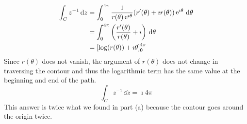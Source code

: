 {\begin{Solution}
\begin{enumerate}
    \begin{align*}
      \int_C z^{-1} \,\mathrm{d} z
      &= \int_0^{4 \pi} \frac{1}{ r(\theta) \mathop{\mathrm{e}}\nolimits^{\imath \theta } }  (r'(\theta) + \imath r(\theta)) \mathop{\mathrm{e}}\nolimits^{\imath \theta} \,\mathrm{d} \theta
      \\
      &= \int_0^{4 \pi} \left( \frac{ r'(\theta) }{ r(\theta) } + \imath \right)\,\mathrm{d} \theta
      \\
      &= \left[ \log(r(\theta)) + \imath \theta \right]_0^{4 \pi}
    \end{align*}
    Since $r(\theta)$ does not vanish, the argument of $r(\theta)$ does not change in 
    traversing the contour and thus the logarithmic term has the same value at 
    the beginning and end of the path.
    \[
    \int_C z^{-1} \,\dd z = \imath 4 \pi
    \]
    This answer is twice what we found in part (a) because the contour goes 
    around the origin twice.
  \end{enumerate}
\end{Solution}




}

